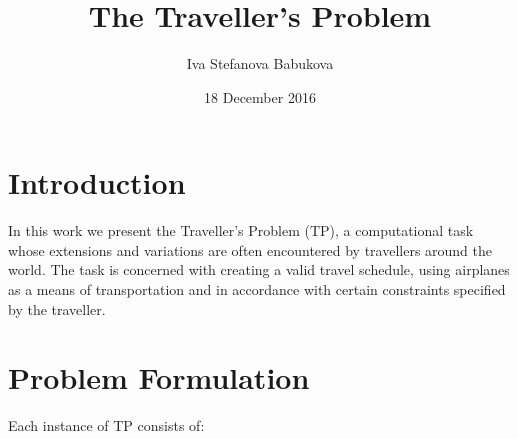 \documentclass{mprop}
\theoremstyle{definition}
\begin{document}
\title{The Traveller's Problem}
\author{Iva Stefanova Babukova}
\date{18 December 2016}
\maketitle

\tableofcontents
\newpage

\section{Introduction}\label{intro}

In this work we present the Traveller's Problem (TP), a computational task whose extensions and variations are often encountered by travellers around the world. The task is concerned with creating a valid travel schedule, using airplanes as a means of transportation and in accordance with certain constraints specified by the traveller.

\section{Problem Formulation}

Each instance of TP consists of:
\end{document}
